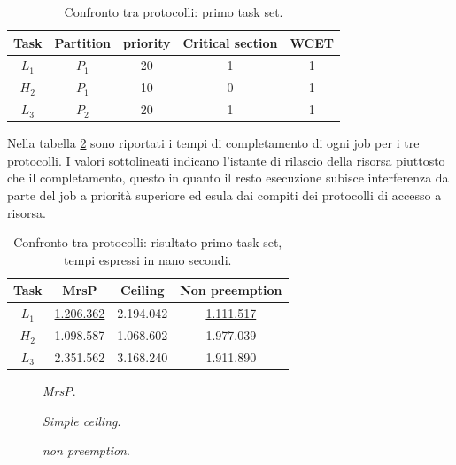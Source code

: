 {\begin{table}
  \centering
  \begin{tabular}{ccccc}
	\hline\hline
	    Task & Partition & priority & Critical section & WCET  \\ \hline
	    $L_1$ & $P_1$  & 20 & 1 & 1 \\
	    $H_2$ & $P_1$  & 10 & 0 & 1 \\
    	$L_3$ & $P_2$  & 20 & 1 & 1 \\
  	\hline
  	\end{tabular}
  \caption{Confronto tra protocolli: primo task set.}
  \label{tab:test_protocols_Taskset1}
\end{table}

\noindent Nella tabella \ref{tab:test_protocols_Taskset1_ris} sono riportati i tempi di completamento di ogni job per i tre protocolli. I valori sottolineati indicano l'istante di rilascio della risorsa piuttosto che il completamento, questo in quanto il resto esecuzione subisce interferenza da parte del job a priorità superiore ed esula dai compiti dei protocolli di accesso a risorsa.\\

\begin{table}
  \centering
  \begin{tabular}{cccc}
  \hline\hline
    Task & MrsP & Ceiling & Non preemption \\ \hline
    $L_1$ & \underline{1.206.362} & 2.194.042 & \underline{1.111.517} \\
    $H_2$ & 1.098.587 & 1.068.602 & 1.977.039 \\
    $L_3$ & 2.351.562 & 3.168.240 & 1.911.890 \\
    \hline
    \end{tabular}
  \caption{Confronto tra protocolli: risultato primo task set, tempi espressi in nano secondi.}
  \label{tab:test_protocols_Taskset1_ris}
\end{table}

    \begin{figure}
      \centering
      \RisultatoUnoMrsP
      \caption{\textit{MrsP}.}
      \label{fig:test_protocols_mrsp}
    \end{figure}

    \begin{figure}
      \centering
      \RisultatoUnoCeiling
      \caption{\textit{Simple ceiling}.}
      \label{fig:test_protocols_sc}
    \end{figure}
    
    \begin{figure}
      \centering
      \RisultatoUnoNoPreempion
      \caption{\textit{non preemption}.}
      \label{fig:test_protocols_np}
    \end{figure}

}
